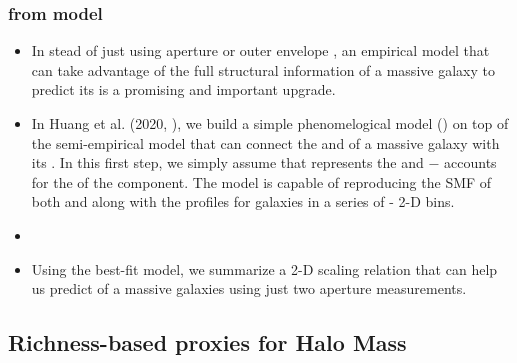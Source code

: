 \documentclass[a4paper,fleqn,usenatbib]{mnras}
\begin{document}
\subsubsection{\mvir{} from \asap{} model}
    \label{sec:masap}


    \begin{itemize}

        \item In stead of just using aperture or outer envelope \mstar{}, an empirical model that
            can take advantage of the full structural information of a massive galaxy to predict
            its \mvir{} is a promising and important upgrade.

        \item In Huang et al. (2020, \addref{}), we build a simple phenomelogical model (\asap{})
            on top of the \um{} semi-empirical model that can connect the \minn{} and \mmax{} of a
            massive galaxy with its \mvir{}.
            In this first step, we simply assume that  represents the \insitu{} \mstar{}
            and \mmax{}$-$ accounts for the \mstar{} of the \exsitu{} component.
            The model is capable of reproducing the SMF of both \mmax{} and  along with
            the \dsigma{} profiles for galaxies in a series of \mmax{}- 2-D bins.

        \item {}

        \item {} Using the best-fit model, we summarize a 2-D scaling relation that
            can help us predict \mvir{} of a massive galaxies using just two aperture \mstar{}
            measurements.

    \end{itemize}

\subsection{Richness-based proxies for Halo Mass}
	\label{sec:proxy_richness}
\end{document}
